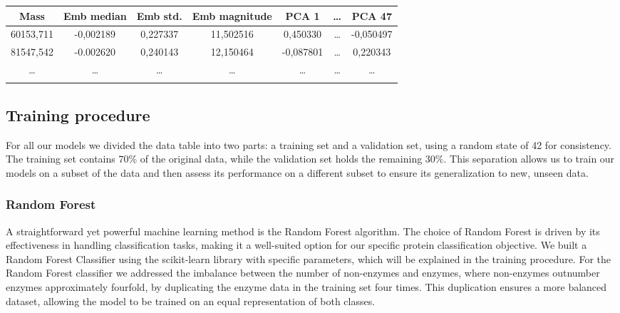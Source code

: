 \documentclass{bioinfo}
\begin{document}
\begin{methods}
\begin{table}[!htbp]
\setlength{\tabcolsep}{2pt}
 {
	\begin{tabular}{@{}ccccccc@{}}
		\toprule 
		Mass & Emb median & Emb std. & Emb magnitude & PCA 1 & \dots & PCA 47\\
		\midrule
		60153,711 & -0,002189 & 0,227337 & 11,502516 & 0,450330 & \dots & -0,050497\\
		81547,542 & -0.002620 & 0,240143 & 12,150464 & -0,087801 & \dots & 0,220343 \\
		\dots & \dots & \dots & \dots & \dots & \dots & \dots \\
		\botrule
    \end{tabular}
}{}
\end{table}

\subsection{Training procedure}
For all our models we divided the data table into two parts: a training set and a validation set, using a random state of 42 for consistency. 
The training set contains $70\%$ of the original data, while the validation set holds the remaining $30\%$. 
This separation allows us to train our models on a subset of the data and then assess its performance on a different subset to ensure its generalization to new, unseen data.

\subsubsection{Random Forest}

A straightforward yet powerful machine learning method is the Random Forest algorithm.
The choice of Random Forest is driven by its effectiveness in handling classification tasks, making it a well-suited option for our specific protein classification objective.
We built a Random Forest Classifier using the scikit-learn library with specific parameters, which will be explained in the training procedure. 
For the Random Forest classifier we addressed the imbalance between the number of non-enzymes and enzymes, where non-enzymes outnumber enzymes approximately fourfold,
by duplicating the enzyme data in the training set four times.
This duplication ensures a more balanced dataset, allowing the model to be trained on an equal representation of both classes.


\end{methods}
\end{document}
